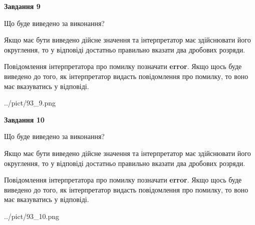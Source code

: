 \documentclass[12pt, ukrainian]{article}
\begin{document}
{\begin {Large}
{\begin {center}\textbf{Завдання 9}\end {center}}\par
Що буде виведено за виконання? \par

Якщо має бути виведено дійсне значення та інтерпретатор має здійснювати його округлення, 
то у відповіді достатньо правильно вказати два дробових розряди.

Повідомлення інтерпретатора про помилку позначати \textbf{error}.
Якщо щось буде виведено до того, як інтерпретатор видасть повідомлення про помилку, 
то воно має вказуватись у відповіді. \par

\begin{center}
	{../pict/93_9.png}
\end{center}
\newpage

{\begin {center}\textbf{Завдання 10}\end {center}}\par
Що буде виведено за виконання? \par

Якщо має бути виведено дійсне значення та інтерпретатор має здійснювати його округлення, 
то у відповіді достатньо правильно вказати два дробових розряди.

Повідомлення інтерпретатора про помилку позначати \textbf{error}.
Якщо щось буде виведено до того, як інтерпретатор видасть повідомлення про помилку, 
то воно має вказуватись у відповіді. \par

\begin{center}
	{../pict/93_10.png}
\end{center}
\newpage

\end {Large}}
\end{document}
